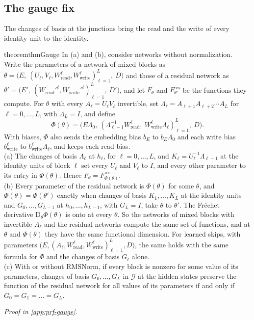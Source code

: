 \documentclass[10pt]{article}
\theoremstyle{definition}
\theoremstyle{remark}
\newcommand{\Wread}{W_{\mathrm{read}}}
\newcommand{\Wwrite}{W_{\mathrm{write}}}
\newcommand{\Der}{\mathrm{D}}
\newcommand{\G}{\mathcal{G}}
\newcommand{\proofin}[1]{\par\vspace{-0.4\baselineskip}\noindent\hfill{\small\itshape Proof in \cref{#1}.}\par\smallskip}
\begin{document}
\subsection{The gauge fix}\label{sec:gaugefix}

The changes of basis at the junctions bring the read and the write of every identity unit to the identity.

\begin{restatable}{theorem}{thmGauge}\label{thm:gauge}
In (a) and (b), consider networks without normalization. Write the parameters of a network of mixed blocks as $\theta = \big(E,\ (U_\ell, V_\ell, \Wread^{\ell}, \Wwrite^{\ell})_{\ell=1}^{L},\ D\big)$ and those of a residual network as $\theta' = \big(E',\ (\Wread'^{\ell}, \Wwrite'^{\ell})_{\ell=1}^{L},\ D'\big)$, and let $F_\theta$ and $F^{\mathrm{res}}_{\theta'}$ be the functions they compute. For $\theta$ with every $A_\ell = U_\ell V_\ell$ invertible, set $\Lambda_\ell = A_{\ell+1} A_{\ell+2} \cdots A_L$ for $\ell = 0, \dots, L$, with $\Lambda_L = I$, and define
\[
\Phi(\theta) = \big(E\Lambda_0,\ (\Lambda_{\ell-1}^{-1}\Wread^{\ell},\ \Wwrite^{\ell}\Lambda_\ell)_{\ell=1}^{L},\ D\big).
\]
With biases, $\Phi$ also sends the embedding bias $b_E$ to $b_E\Lambda_0$ and each write bias $b^{\ell}_{\mathrm{write}}$ to $b^{\ell}_{\mathrm{write}}\Lambda_\ell$, and keeps each read bias.\\
\textup{(a)} The changes of basis $\Lambda_\ell$ at $h_\ell$, for $\ell = 0, \dots, L$, and $K_\ell = U_\ell^{-1}\Lambda_{\ell-1}$ at the identity units of block $\ell$ set every $U_\ell$ and $V_\ell$ to $I$, and every other parameter to its entry in $\Phi(\theta)$. Hence $F_\theta = F^{\mathrm{res}}_{\Phi(\theta)}$.\\
\textup{(b)} Every parameter of the residual network is $\Phi(\theta)$ for some $\theta$, and $\Phi(\theta) = \Phi(\theta')$ exactly when changes of basis $K_1, \dots, K_L$ at the identity units and $G_0, \dots, G_{L-1}$ at $h_0, \dots, h_{L-1}$, with $G_L = I$, take $\theta$ to $\theta'$. The Fr\'echet derivative $\Der_\theta\Phi(\theta)$ is onto at every $\theta$. So the networks of mixed blocks with invertible $A_\ell$ and the residual networks compute the same set of functions, and at $\theta$ and $\Phi(\theta)$ they have the same functional dimension. For learned skips, with parameters $\big(E, (A_\ell, \Wread^{\ell}, \Wwrite^{\ell})_{\ell=1}^{L}, D\big)$, the same holds with the same formula for $\Phi$ and the changes of basis $G_\ell$ alone.\\
\textup{(c)} With or without RMSNorm, if every block is nonzero for some value of its parameters, changes of basis $G_0, \dots, G_L$ in $\G$ at the hidden states preserve the function of the residual network for all values of its parameters if and only if $G_0 = G_1 = \dots = G_L$.
\end{restatable}
\proofin{app:prf-gauge}
\end{document}
